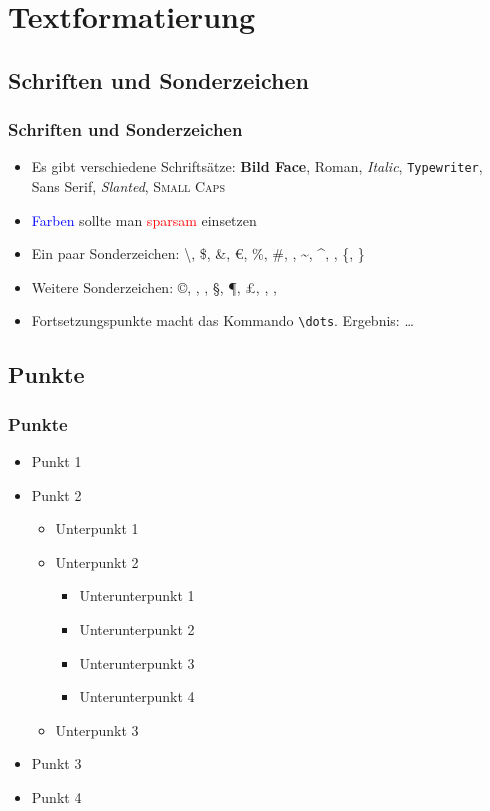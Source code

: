 \documentclass{beamer}
\begin{document}
\section{Textformatierung}

\subsection{Schriften und Sonderzeichen}

\begin{frame}[fragile]
\frametitle{Schriften und Sonderzeichen}
\begin{itemize}
\item Es gibt verschiedene Schriftsätze: \textbf{Bild Face}, \textrm{Roman}, \textit{Italic}, \texttt{Typewriter}, \textsf{Sans Serif}, \textsl{Slanted}, \textsc{Small Caps}
\item \textcolor{blue}{Farben} sollte man \textcolor{red}{sparsam} einsetzen
\item Ein paar Sonderzeichen: \textbackslash, \$, \&, \euro, \%, \#, \textunderscore, \textasciitilde, \textasciicircum, \textbar, \{, \}
\item Weitere Sonderzeichen: \copyright, \textregistered, \texttrademark, \S, \P, \pounds, \dag, \ddag, \textbullet
\item Fortsetzungspunkte macht das Kommando \verb!\dots!. Ergebnis: \dots
\end{itemize}
\end{frame}

\subsection{Punkte}
\begin{frame}
\frametitle{Punkte}
\begin{itemize}
\item Punkt 1
\item Punkt 2
\begin{itemize}
\item Unterpunkt 1
\item Unterpunkt 2
\begin{itemize}
\item Unterunterpunkt 1
\item Unterunterpunkt 2
\item Unterunterpunkt 3
\item Unterunterpunkt 4
\end{itemize}
\item Unterpunkt 3
\end{itemize}
\item Punkt 3
\item Punkt 4
\end{itemize}
\end{frame}
\end{document}
